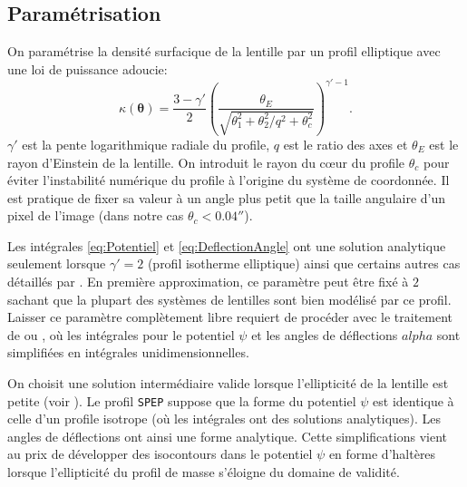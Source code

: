 \documentclass[times,10pt,twocolumn]{article}
\begin{document}
\subsection{Paramétrisation}
On paramétrise la densité surfacique de la lentille par un profil elliptique avec une loi 
de puissance adoucie:
\begin{equation}\label{eq:Kappa} 
        \kappa(\boldsymbol{\theta}) = \frac{3 - \gamma'}{2} 
        \left( 
                \frac{\theta_E}{\sqrt{\theta_1^2 + \theta_2^2/q^2 + \theta_c^2}}
\right)^{\gamma'- 1}. 
\end{equation} 
$\gamma'$ est la pente logarithmique radiale du profile, $q$ est le ratio des axes 
et $\theta_E$ est le rayon d'Einstein de la lentille. On introduit le rayon du c{\oe}ur 
du profile 
$\theta_c$ pour éviter l'instabilité numérique du profile à l'origine du système de coordonnée. 
Il est pratique de fixer sa valeur à un angle plus petit que la taille angulaire d'un 
pixel de l'image (dans notre cas $\theta_c < 0.04''$). \par


Les intégrales \eqref{eq:Potentiel} et \eqref{eq:DeflectionAngle} ont une solution analytique 
seulement lorsque $\gamma'= 2$ (profil isotherme elliptique) ainsi que certains autres cas 
détaillés par \citet{Keeton2001}. En première approximation, ce paramètre peut être fixé 
à $2$ sachant que la plupart des systèmes de lentilles sont bien modélisé par ce profil. 
Laisser ce paramètre complètement libre requiert de procéder avec le traitement de 
\citet{Barkana1998} ou \citet{Tessore2015}, où les intégrales pour le potentiel $\psi$ 
et les angles de déflections $alpha$ 
sont simplifiées en intégrales unidimensionnelles. \par

On choisit une solution intermédiaire valide lorsque l'ellipticité de la lentille est 
petite (voir \citet{Barkana1998}). Le profil \texttt{SPEP} suppose que la forme 
du potentiel $\psi$ est identique à celle d'un profile isotrope (où 
les intégrales ont des solutions analytiques). Les angles de déflections 
ont ainsi une forme analytique. Cette simplifications vient 
au prix de développer des isocontours dans le potentiel $\psi$
en forme d'haltères lorsque 
l'ellipticité du profil de masse s'éloigne du domaine de validité.
\end{document}
